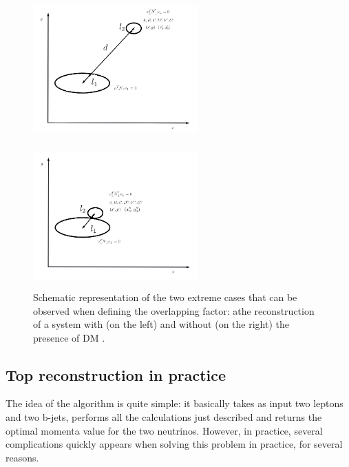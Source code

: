 \documentclass[a4paper, 10pt, openright]{report}
\begin{document}
\begin{itemize}
\begin{figure}[htbp]
\centering
\begin{minipage}[b]{.48\textwidth}
\includegraphics[width=6.3cm, height=5.5cm]{figs/ElipseDM3.png}
\end{minipage}\hfill
\begin{minipage}[b]{.48\textwidth}
\includegraphics[width=6.3cm, height=5.5cm]{figs/Elipsettnormal.png}
\end{minipage} \hfill
\caption{ Schematic representation of the two extreme cases that can be observed when defining the overlapping factor: athe reconstruction of a system with (on the left) and without (on the right) the presence of \ac{DM} \cite{Agustin}.}
\label{fig:ellipsesDM}
\end{figure}

\end{itemize}

\subsection{Top reconstruction in practice}

The idea of the algorithm is quite simple: it basically takes as input two leptons and two b-jets, performs all the calculations just described and returns the optimal momenta value for the two neutrinos. However, in practice, several complications quickly appears when solving this problem in practice, for several reasons.
\end{document}
